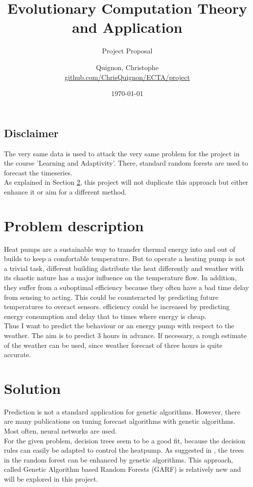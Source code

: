 \documentclass{scrartcl}
\begin{document}
\title{Evolutionary Computation Theory and Application}
\subtitle{Project Proposal}
\author{
  Quignon, Christophe \\
  \href{https://github.com/ChrisQuignon/ECTA/report}{github.com/ChrisQuignon/ECTA/project}
} 
\date{\today}


\maketitle

\subsection*{Disclaimer}
The very same data is used to attack the very same problem for the project in the course 'Learning and Adaptivity'. There, standard random forests are used to forecast the timeseries.\\
As explained in Section \ref{sec:Solution}, this project will not duplicate this approach but either enhance it or aim for a different method.

\section{Problem description}
Heat pumps are a sustainable way to transfer thermal energy into and out of  builds to keep a comfortable temperature. But to operate a heating pump is not a trivial task, different building distribute the heat differently and weather with its chaotic nature has a major influence on the temperature flow. In addition, they suffer from a suboptimal efficiency because they often have a bad time delay from sensing to acting. This could be counteracted by predicting future temperatures to overact sensors. efficiency could be increased by predicting energy consumption and delay that to times where energy is cheap.\\
Thus I want to predict the behaviour or an energy pump with respect to the weather. The aim is to predict 3 hours in advance. If necessary, a rough estimate of the weather can be used, since weather forecast of three hours is quite accurate.

\section{Solution}
\label{sec:Solution}

Prediction is not a standard application for genetic algorithms. However, there are many publications on tuning forecast algorithms with genetic algorithms. Most often, neural networks are used.\\
For the given problem, decision trees seem to be a good fit, because the decision rules can easily be adapted to control the heatpump. As suggested in \cite{bader2012garf}, the trees in the random forest can be enhanced by genetic algorithms. This approach, called  Genetic Algorithm based Random Forests (GARF) is relatively new and will be explored in this project.
\end{document}
